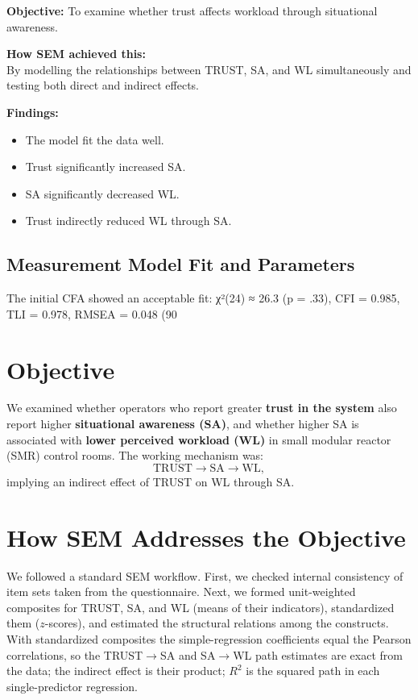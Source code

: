 \documentclass[conference]{IEEEtran}
\begin{document}
\textbf{Objective:} To examine whether trust affects workload through situational awareness.

\textbf{How SEM achieved this:} \\
By modelling the relationships between TRUST, SA, and WL simultaneously and testing both direct and indirect effects.

\textbf{Findings:}
\begin{itemize}
    \item The model fit the data well.
    \item Trust significantly increased SA.
    \item SA significantly decreased WL.
    \item Trust indirectly reduced WL through SA.
\end{itemize}


\subsection{Measurement Model Fit and Parameters}
The initial CFA showed an acceptable fit: χ²(24) ≈ 26.3 (p = .33), CFI = 0.985, TLI = 0.978, RMSEA = 0.048 (90%

\section{Objective}
We examined whether operators who report greater \textbf{trust in the system} also report higher \textbf{situational awareness (SA)}, and whether higher SA is associated with \textbf{lower perceived workload (WL)} in small modular reactor (SMR) control rooms. The working mechanism was:
\[
\text{TRUST} \rightarrow \text{SA} \rightarrow \text{WL},
\]
implying an indirect effect of TRUST on WL through SA.

\section{How SEM Addresses the Objective}
We followed a standard SEM workflow. First, we checked internal consistency of item sets taken from the questionnaire. Next, we formed unit-weighted composites for TRUST, SA, and WL (means of their indicators), standardized them (\(z\)-scores), and estimated the structural relations among the constructs. With standardized composites the simple-regression coefficients equal the Pearson correlations, so the TRUST\(\rightarrow\)SA and SA\(\rightarrow\)WL path estimates are exact from the data; the indirect effect is their product; \(R^2\) is the squared path in each single-predictor regression.
\end{document}
